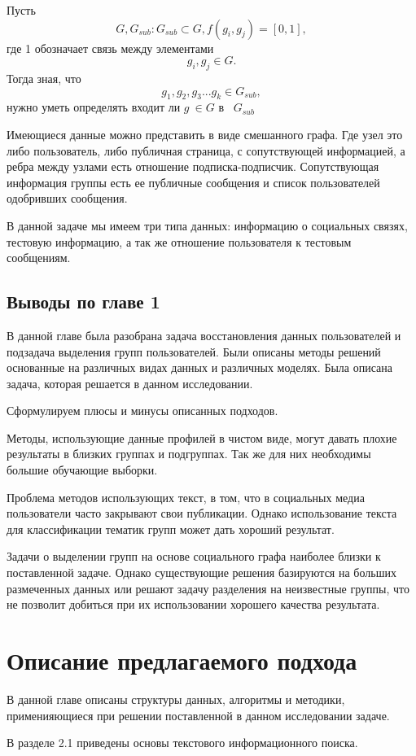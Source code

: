 \documentclass[annotation,times,page4]{itmo-student-thesis}
\begin{document}
Пусть \exist
\[
 G, G_{sub}: G_{sub} \subset G, f(g_{i}, g_{j}) = [0, 1],
\]
где 1 обозначает связь между элементами
\[
g_{i}, g_{j} \in G.   
\]
Тогда зная, что
\[
g_{1},g_{2}, g_{3} ... g_{k} \in G_{sub},
\]
нужно уметь определять входит ли $g ~\in G$ в ~$G_{sub}$

Имеющиеся данные можно представить в виде смешанного графа. Где узел это либо пользователь, либо публичная страница, с сопутствующей информацией, а ребра между узлами есть отношение подписка-подписчик. Сопутствующая информация группы есть ее публичные сообщения и список пользователей одобривших сообщения. 

В данной задаче мы имеем три типа данных: информацию о социальных связях, тестовую информацию, а так же отношение пользователя к тестовым сообщениям. 

\section{Выводы по главе 1}
В данной главе была разобрана задача восстановления данных пользователей и подзадача выделения групп пользователей. Были описаны методы решений основанные на различных видах данных и различных моделях. Была описана задача, которая решается в данном исследовании.

Сформулируем плюсы и минусы описанных подходов.

Методы, использующие данные профилей в чистом виде, могут давать плохие результаты в близких группах и подгруппах. Так же для них необходимы большие обучающие выборки.

Проблема методов использующих текст, в том, что в социальных медиа пользователи часто закрывают свои публикации. Однако использование текста для классификации тематик групп может дать хороший результат.

Задачи о выделении групп на основе социального графа наиболее близки к поставленной задаче. Однако существующие решения базируются на больших размеченных данных или решают задачу разделения на неизвестные группы, что не позволит добиться при их использовании хорошего качества результата.


\chapter{Описание предлагаемого подхода}
В данной главе описаны структуры данных, алгоритмы и методики, применияющиеся при решении поставленной в данном исследовании задаче.

В разделе 2.1 приведены основы текстового информационного поиска.
\end{document}
